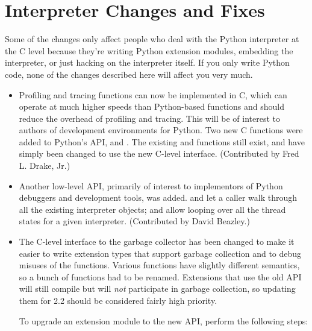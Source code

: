 \documentclass{howto}
\begin{document}
\section{Interpreter Changes and Fixes}

Some of the changes only affect people who deal with the Python
interpreter at the C level because they're writing Python extension modules,
embedding the interpreter, or just hacking on the interpreter itself.
If you only write Python code, none of the changes described here will
affect you very much.

\begin{itemize}

  \item Profiling and tracing functions can now be implemented in C,
  which can operate at much higher speeds than Python-based functions
  and should reduce the overhead of profiling and tracing.  This 
  will be of interest to authors of development environments for
  Python.  Two new C functions were added to Python's API,
   and .
  The existing  and
   functions still exist, and have simply
  been changed to use the new C-level interface.  (Contributed by Fred
  L. Drake, Jr.)

  \item Another low-level API, primarily of interest to implementors
  of Python debuggers and development tools, was added.
   and
   let a caller walk through all
  the existing interpreter objects;
   and
   allow looping over all the thread
  states for a given interpreter.  (Contributed by David Beazley.)

\item The C-level interface to the garbage collector has been changed
to make it easier to write extension types that support garbage
collection and to debug misuses of the functions.
Various functions have slightly different semantics, so a bunch of
functions had to be renamed.  Extensions that use the old API will
still compile but will \emph{not} participate in garbage collection,
so updating them for 2.2 should be considered fairly high priority.

To upgrade an extension module to the new API, perform the following
steps:


\end{itemize}
\end{document}
